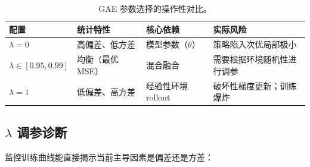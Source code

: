 \begin{table}[ht!]
\centering\small
\caption{GAE 参数选择的操作性对比。}
\noindent\begin{tabularx}{\linewidth}{@{}l Z{0.78} Z{0.88} Z{1.34}@{}}
\toprule
\textbf{配置} & \textbf{统计特性} & \textbf{核心依赖} & \textbf{实际风险} \\
\midrule
$\lambda = 0$ & 高偏差、低方差 & 模型参数（$\theta$） & 策略陷入次优局部极小 \\
$\lambda \in [0.95, 0.99]$ & 均衡（最优 MSE） & 混合融合 & 需要根据环境随机性进行调参 \\
$\lambda = 1$ & 低偏差、高方差 & 经验性环境 rollout & 破坏性梯度更新；训练爆炸 \\
\bottomrule
\end{tabularx}
\end{table}

\subsection{\texorpdfstring{$\lambda$ 调参诊断}{lambda 调参诊断}}
\label{diagnostics-for-tuning-lambda}

监控训练曲线能直接揭示当前主导因素是偏差还是方差：

